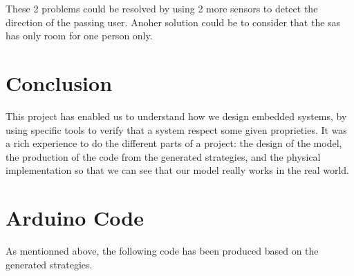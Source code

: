 These 2 problems could be resolved by using 2 more sensors to detect the direction of the passing user. Anoher solution could be to consider that the sas has only room for one person only.

\section{Conclusion}
This project has enabled us to understand how we design embedded systems, by using specific tools to verify that a system respect some given proprieties. It was a rich experience to do the different parts of a project: the design of the model, the production of the code from the generated strategies, and the physical implementation so that we can see that our model really works in the real world.


\newpage

\appendix

\section{Arduino Code}\label{ap:code}
As mentionned above, the following code has been produced based on the generated strategies.\\

